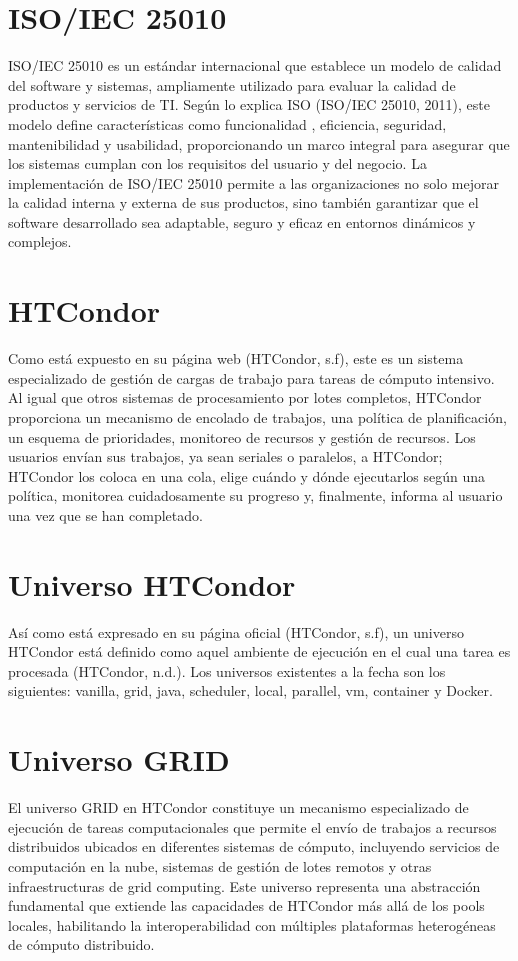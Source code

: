 \section{ISO/IEC 25010}
ISO/IEC 25010 es un estándar internacional que establece un modelo de calidad del software y
sistemas, ampliamente utilizado para evaluar la calidad de productos y servicios de TI. Según lo
explica ISO (ISO/IEC 25010, 2011), este modelo define características como funcionalidad ,
eficiencia, seguridad, mantenibilidad y usabilidad, proporcionando un marco integral para
asegurar que los sistemas cumplan con los requisitos del usuario y del negocio. La
implementación de ISO/IEC 25010 permite a las organizaciones no solo mejorar la calidad
interna y externa de sus productos, sino también garantizar que el software desarrollado sea
adaptable, seguro y eficaz en entornos dinámicos y complejos.

\section{HTCondor}
Como está expuesto en su página web (HTCondor, s.f), este es un sistema
especializado de gestión de cargas de trabajo para tareas de cómputo intensivo. Al igual que otros
sistemas de procesamiento por lotes completos, HTCondor proporciona un mecanismo de
encolado de trabajos, una política de planificación, un esquema de prioridades, monitoreo de
recursos y gestión de recursos. Los usuarios envían sus trabajos, ya sean seriales o paralelos, a
HTCondor; HTCondor los coloca en una cola, elige cuándo y dónde ejecutarlos según una
política, monitorea cuidadosamente su progreso y, finalmente, informa al usuario una vez que se
han completado.

\section{Universo HTCondor}
Así como está expresado en su página oficial (HTCondor, s.f), un universo HTCondor
está definido como aquel ambiente de ejecución en el cual una tarea es procesada (HTCondor,
n.d.). Los universos existentes a la fecha son los siguientes: vanilla, grid, java, scheduler, local,
parallel, vm, container y Docker.

\section{Universo GRID}
El universo GRID en HTCondor constituye un mecanismo especializado de ejecución de tareas 
computacionales que permite el envío de trabajos a recursos distribuidos ubicados en diferentes 
sistemas de cómputo, incluyendo servicios de computación en la nube, sistemas de gestión de lotes 
remotos y otras infraestructuras de grid computing. Este universo representa una abstracción fundamental
que extiende las capacidades de HTCondor más allá de los pools locales, habilitando la interoperabilidad
con múltiples plataformas heterogéneas de cómputo distribuido.